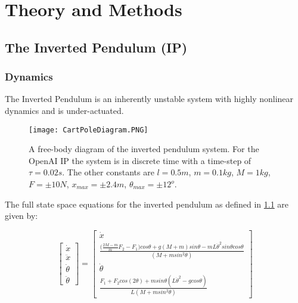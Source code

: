 \documentclass[../main.tex]{subfiles}
\begin{document}
\onlyinsubfile{\tableofcontents{}}

\chapter{Theory and Methods}

\section{The Inverted Pendulum (IP)}

\subsection{Dynamics}
The Inverted Pendulum is an inherently unstable system with highly nonlinear dynamics and is under-actuated.

\begin{figure}[ht]
    \centering
    \texttt{[image: CartPoleDiagram.PNG]}
    \caption{A free-body diagram of the inverted pendulum system. For the OpenAI IP the system is in discrete time with a time-step of $\tau =  0.02s$. The other constants are $l = 0.5m$, $m=0.1kg$, $M=1kg$, $F=\pm10N$, $x_{max}=\pm 2.4m$, $\theta_{max} = \pm 12^o$.}
    \label{fig:invpen}
\end{figure}

The full state space equations for the inverted pendulum as defined in \cref{fig:invpen} are given by:

\begin{equation}
\begin{bmatrix} \dot{x} \\ \ddot{x} \\ \dot{\theta} \\ \ddot{\theta} \end{bmatrix}  =
\begin{bmatrix} \dot{x} \\ \frac{\big(\frac{2M-m}{m}F_2-F_1\big)cos\theta + g(M+m)sin\theta - mL\dot{\theta}^2 sin\theta cos\theta}{(M + m sin^2\theta)} \\ \dot{\theta} \\ \frac{F_1 + F_2cos(2\theta)+ msin\theta(L\dot{\theta}^2-g cos\theta)}{L(M+m sin^2\theta)} \end{bmatrix} 
\end{equation}
\end{document}
